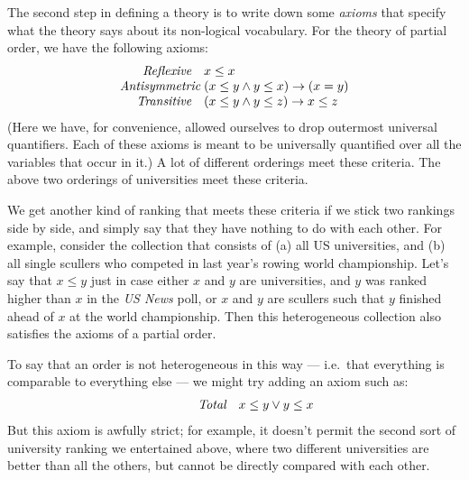 The second step in defining a theory is to write down some
\emph{axioms} that specify what the theory says about its non-logical
vocabulary. For the theory of partial order, we have the following
axioms:
\[ \begin{array}{>{\raggedleft\it}p{2cm} l}
Reflexive & x\leq x \\
Antisymmetric & (x\leq y\wedge y\leq x)\to (x=y) \\
Transitive & (x\leq y\wedge y\leq z)\to x\leq z \end{array} \]
(Here we have, for convenience, allowed ourselves to drop outermost
universal quantifiers.  Each of these axioms is meant to be
universally quantified over all the variables that occur in it.)  A
lot of different orderings meet these criteria.  The above two
orderings of universities meet these criteria.

We get another kind of ranking that meets these criteria if we stick
two rankings side by side, and simply say that they have nothing to do
with each other.  For example, consider the collection that consists
of (a) all US universities, and (b) all single scullers who competed
in last year's rowing world championship.  Let's say that $x\leq y$
just in case either $x$ and $y$ are universities, and $y$ was ranked
higher than $x$ in the {\it US News} poll, or $x$ and $y$ are scullers
such that $y$ finished ahead of $x$ at the world championship.  Then
this heterogeneous collection also satisfies the axioms of a partial
order.

To say that an order is not heterogeneous in this way --- i.e.\ that
everything is comparable to everything else --- we might try adding an
axiom such as:
\[ \begin{array}{>{\raggedleft\it}p{2cm} l}
Total & x\leq y\vee y\leq x \end{array} \]
  But this axiom is awfully strict; for example, it doesn't permit the
  second sort of university ranking we entertained above, where two
  different universities are better than all the others, but cannot be
  directly compared with each other.

